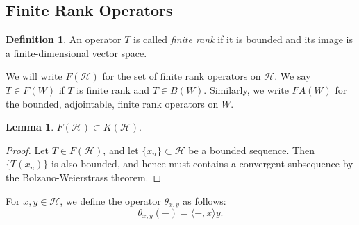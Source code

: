 \documentclass{dcthesis}
\numberwithin{equation}{section}
\numberwithin{equation}{section}
\theoremstyle{definition}
\newtheorem{lemma}[equation]{Lemma}
\newtheorem{definition}[equation]{Definition}
\begin{document}

\subsection{Finite Rank Operators} %

\begin{definition}
	An operator $T$ is called \emph{finite rank} if it is bounded and its image is a finite-dimensional vector space. 
\end{definition}

We will write $F(\mathcal{H})$ for the set of finite rank operators on $\mathcal{H}$. We say $T\in F(W)$ if $T$ is finite rank and $T\in B(W)$. Similarly, we write $FA(W)$ for the bounded, adjointable, finite rank operators on $W$.

\begin{lemma}
	$F(\mathcal{H})\subset K(\mathcal{H})$.
\end{lemma}
\begin{proof}
	Let $T\in F(\mathcal{H})$, and let $\{x_n\}\subset\mathcal{H}$ be a bounded sequence. Then $\{T(x_n)\}$ is also bounded, and hence must contains a convergent subsequence by the Bolzano-Weierstrass theorem.
\end{proof}

For $x,y\in\mathcal{H}$, we define the operator $\theta_{x,y}$ as follows:
\begin{equation*}
	\theta_{x,y}(-)=\langle -, x\rangle y.
\end{equation*}
\end{document}
